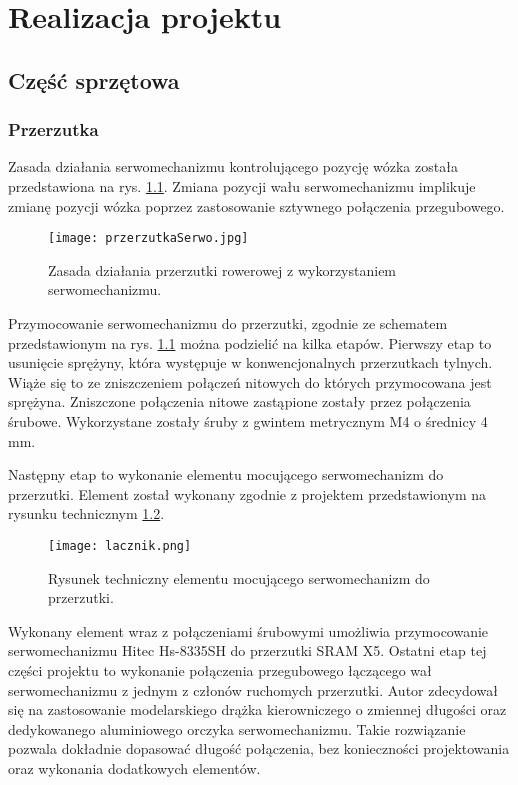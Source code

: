 \chapter{Realizacja projektu}
\section{Część sprzętowa}
\subsection{Przerzutka }
 Zasada działania serwomechanizmu kontrolującego pozycję wózka została przedstawiona na rys. \ref{fig:przerzutkaSerwo}. Zmiana pozycji wału serwomechanizmu implikuje zmianę pozycji wózka poprzez zastosowanie sztywnego połączenia przegubowego.
 \begin{figure}[h]
    \centering
    \texttt{[image: przerzutkaSerwo.jpg]}
    \caption{Zasada działania przerzutki rowerowej z wykorzystaniem serwomechanizmu.}
    \label{fig:przerzutkaSerwo}
\end{figure}

Przymocowanie serwomechanizmu do przerzutki, zgodnie ze schematem przedstawionym na rys. \ref{fig:przerzutkaSerwo}  można podzielić na kilka etapów.
Pierwszy etap to usunięcie sprężyny, która występuje w konwencjonalnych przerzutkach tylnych. Wiąże się to ze zniszczeniem połączeń nitowych do których przymocowana jest sprężyna. Zniszczone połączenia nitowe zastąpione zostały przez połączenia śrubowe. Wykorzystane zostały śruby z gwintem metrycznym M4 o średnicy 4 mm.

Następny etap to wykonanie elementu mocującego serwomechanizm do przerzutki. Element został wykonany zgodnie z projektem przedstawionym na rysunku technicznym \ref{fig:lacznik}.
\begin{figure}[h]
    \centering
    \texttt{[image: lacznik.png]}
    \caption{Rysunek techniczny elementu mocującego serwomechanizm do przerzutki.}
    \label{fig:lacznik}
\end{figure}

Wykonany element wraz z połączeniami śrubowymi umożliwia przymocowanie serwomechanizmu Hitec Hs-8335SH do przerzutki SRAM X5. Ostatni etap tej części projektu to wykonanie połączenia przegubowego łączącego wał serwomechanizmu z jednym z członów ruchomych przerzutki. Autor zdecydował się na zastosowanie modelarskiego drążka kierowniczego o zmiennej długości oraz dedykowanego aluminiowego orczyka serwomechanizmu. Takie rozwiązanie pozwala dokładnie dopasować długość  połączenia, bez konieczności projektowania oraz wykonania dodatkowych elementów.

